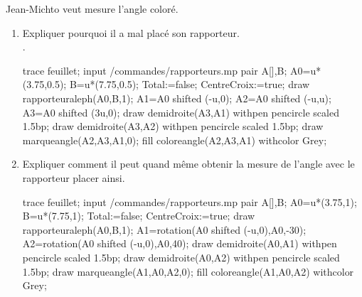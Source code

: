 \begin{exercice*}
   Jean-Michto veut mesure l'angle coloré.
   \begin{enumerate}
       \item  
       Expliquer pourquoi il a mal placé son rapporteur.\\.\\
       \begin{Geometrie}[CoinBG={(0,-3.5u)},CoinHD={(7.5u,4u)}]
         trace feuillet;
         input \persopath/commandes/rapporteurs.mp
         pair A[],B;
         A0=u*(3.75,0.5);
         B=u*(7.75,0.5);
         Total:=false;%
         CentreCroix:=true;%
         draw rapporteuraleph(A0,B,1);        
         A1=A0 shifted (-u,0); 
         A2=A0 shifted (-u,u);
         A3=A0 shifted (3u,0);
         draw demidroite(A3,A1) withpen pencircle scaled 1.5bp;
         draw demidroite(A3,A2) withpen pencircle scaled 1.5bp;
         draw marqueangle(A2,A3,A1,0);
         fill coloreangle(A2,A3,A1) withcolor Grey;
      \end{Geometrie}
      \par\vspace*{4mm}\dotfill
      \par\vspace*{4mm}\dotfill
      \item Expliquer comment il peut quand même obtenir la mesure de l'angle avec le rapporteur placer ainsi.\\\smallskip
      \begin{Geometrie}[CoinBG={(0,-3u)},CoinHD={(7.5u,4.5u)}]
         trace feuillet;
         input \persopath/commandes/rapporteurs.mp
         pair A[],B;
         A0=u*(3.75,1);
         B=u*(7.75,1);
         Total:=false;%
         CentreCroix:=true;%
         draw rapporteuraleph(A0,B,1);
         A1=rotation(A0 shifted (-u,0),A0,-30); 
         A2=rotation(A0 shifted (-u,0),A0,40);           
         draw demidroite(A0,A1) withpen pencircle scaled 1.5bp;
         draw demidroite(A0,A2) withpen pencircle scaled 1.5bp;
         draw marqueangle(A1,A0,A2,0);
         fill coloreangle(A1,A0,A2) withcolor Grey;
      \end{Geometrie}
      \par\vspace*{4mm}\dotfill
      \par\vspace*{4mm}\dotfill
      \par\vspace*{4mm}\dotfill
   \end{enumerate}
\end{exercice*}
